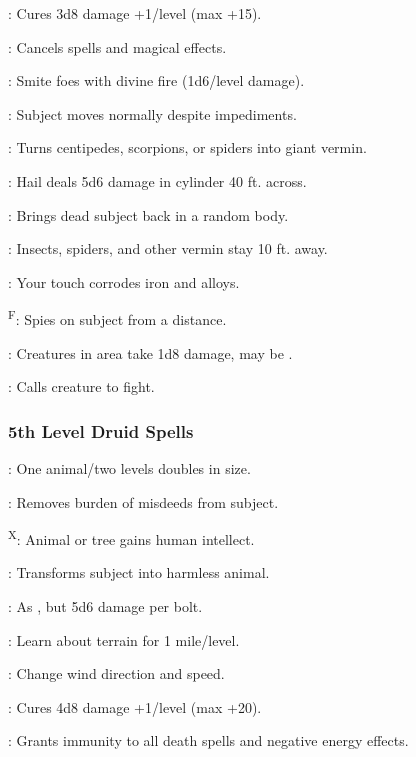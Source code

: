 : Cures 3d8 damage +1/level (max +15).

: Cancels spells and magical effects.

: Smite foes with divine fire (1d6/level damage).

: Subject moves normally despite impediments.

: Turns centipedes, scorpions, or spiders into giant vermin.

: Hail deals 5d6 damage in cylinder 40 ft. across.

: Brings dead subject back in a random body.

: Insects, spiders, and other vermin stay 10 ft. away.

: Your touch corrodes iron and alloys.

\textsuperscript{F}: Spies on subject from a distance.

: Creatures in area take 1d8 damage, may be .

: Calls creature to fight.

\subsubsection{5th Level Druid Spells}

: One animal/two levels doubles in size.

: Removes burden of misdeeds from subject.

\textsuperscript{X}: Animal or tree gains human intellect.

: Transforms subject into harmless animal.

: As , but 5d6 damage per bolt.

: Learn about terrain for 1 mile/level.

: Change wind direction and speed.

: Cures 4d8 damage +1/level (max +20).

: Grants immunity to all death spells and negative energy effects.

